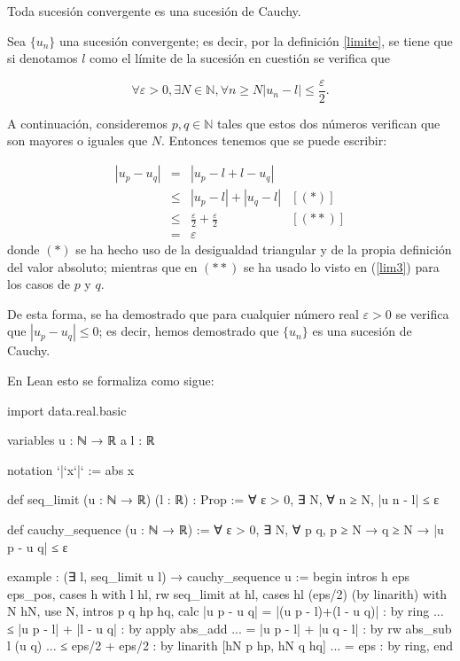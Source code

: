 \begin{teorema}
  Toda sucesión convergente es una sucesión de Cauchy.
\end{teorema}
\begin{demostracion}
  Sea \(\{u_n\}\) una sucesión convergente; es decir, por la definición
  \ref{limite}, se tiene que si denotamos \(l\) como el límite de la
  sucesión en cuestión se verifica que

  \begin{equation}\label{lim3}
  ∀ ε > 0, ∃ N ∈ ℕ, ∀ n ≥ N |u_n-l| ≤ \frac{ε}{2}.
  \end{equation}

  A continuación, consideremos \(p,q ∈ ℕ\) tales que estos dos números
  verifican que son mayores o iguales que \(N\). Entonces tenemos que se
  puede escribir:


  \[\begin{array}{llll}
      |u_p-u_q| &= &|u_p-l+l-u_q|           & \\
                &≤ &|u_p-l|+|u_q-l|         & [(*)] \\
                &≤ &\frac{ε}{2}+\frac{ε}{2} & [(**)] \\
                &= &ε
  \end{array}\]
  donde \((*)\) se ha hecho uso de la desigualdad triangular y de la
  propia definición del valor absoluto; mientras que en \((**)\) se ha
  usado lo visto en (\ref{lim3}) para los casos de \(p\) y \(q\).

  De esta forma, se ha demostrado que para cualquier número real \(ε > 0\)
  se verifica que \(|u_p - u_q| ≤ 0\); es decir, hemos demostrado
  que \(\{u_n\}\) es una sucesión de Cauchy.
\end{demostracion}

En Lean esto se formaliza como sigue:
\begin{leancode}
import data.real.basic

variables {u : ℕ → ℝ} {a l : ℝ}

notation `|`x`|` := abs x

def seq_limit (u : ℕ → ℝ) (l : ℝ) : Prop :=
∀ ε > 0, ∃ N, ∀ n ≥ N, |u n - l| ≤ ε

def cauchy_sequence (u : ℕ → ℝ) :=
∀ ε > 0, ∃ N, ∀ p q, p ≥ N → q ≥ N → |u p - u q| ≤ ε

example : (∃ l, seq_limit u l) → cauchy_sequence u :=
begin
  intros h eps eps_pos,
  cases h with l hl,
  rw seq_limit at hl,
  cases hl (eps/2) (by linarith) with N hN,
  use N,
    intros p q hp hq,
  calc  |u p - u q|
      = |(u p - l)+(l - u q)|  : by ring
  ... ≤ |u p - l| + |l - u q|  : by apply abs_add
  ... = |u p - l| + |u q - l|  : by rw abs_sub l (u q)
  ... ≤ eps/2 + eps/2          : by linarith [hN p hp, hN q hq]
  ... = eps                    : by ring,
end
\end{leancode}

